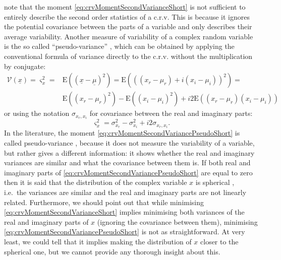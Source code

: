 \documentclass[
]{book}
\begin{document}
\citet{Picinbono1997} note that the moment \eqref{eq:crvMomentSecondVarianceShort} is not sufficient to entirely describe the second order statistics of a c.r.v. This is because it ignores the potential covariance between the parts of a variable and only describes their average variability. Another measure of variability of a complex random variable is the so called ``pseudo-variance'' \citep[in many papers in signal processing, for example, in][]{Javidi2011}, which can be obtained by applying the conventional formula of variance directly to the c.r.v. without the multiplication by conjugate:
\begin{equation}
    \begin{aligned}
    \mathcal{V}(\underline{x}) = \varsigma_x^2 = & \mathrm{E}((\underline{x}-\underline{\mu})^2) = \mathrm{E}\left(((x_r-\mu_{r}) + i (x_i-\mu_{i}))^2\right) = \\
                    & \mathrm{E}((x_r-\mu_{r})^2) - \mathrm{E}((x_i-\mu_{i})^2) + i2 \mathrm{E}((x_r-\mu_{r})(x_i-\mu_{i}))
    \end{aligned}
    \label{eq:crvMomentSecondVariancePseudo}
\end{equation}
or using the notation \(\sigma_{x_r,x_i}\) for covariance between the real and imaginary parts:
\begin{equation}
    \varsigma_x^2 = \sigma_{x_r}^2 - \sigma_{x_i}^2 + i2 \sigma_{x_r,x_i}.
    \label{eq:crvMomentSecondVariancePseudoShort}
\end{equation}
In the literature, the moment \eqref{eq:crvMomentSecondVariancePseudoShort} is called pseudo-variance \citep[e.g.,][]{Trampitsch2013}, because it does not measure the variability of a variable, but rather gives a different information: it shows whether the real and imaginary variances are similar and what the covariance between them is. If both real and imaginary parts of \eqref{eq:crvMomentSecondVariancePseudoShort} are equal to zero then it is said that the distribution of the complex variable \(x\) is spherical \citep{reference}, i.e.~the variances are similar and the real and imaginary parts are not linearly related. Furthermore, we should point out that while minimising \eqref{eq:crvMomentSecondVarianceShort} implies minimising both variances of the real and imaginary parts of \(x\) (ignoring the covariance between them), minimising \eqref{eq:crvMomentSecondVariancePseudoShort} is not as straightforward. At very least, we could tell that it implies making the distribution of \(x\) closer to the spherical one, but we cannot provide any thorough insight about this.
\end{document}
